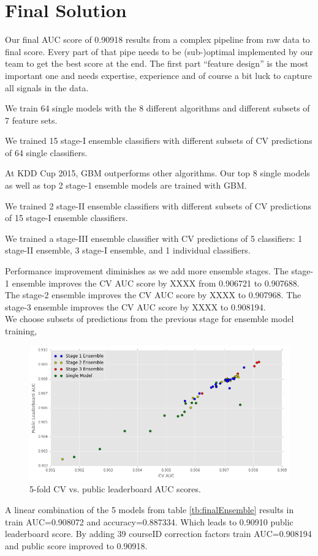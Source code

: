 \section{Final Solution}
Our final AUC score of 0.90918 results from a complex pipeline from raw data to final score.
Every part of that pipe needs to be (sub-)optimal implemented by our team to get the best score at the end.
The first part ``feature design'' is the most important one and needs expertise, experience and of course a bit luck to capture all signals in the data.

We train 64 single models with the 8 different algorithms and different subsets of 7 feature sets.

We trained 15 stage-I ensemble classifiers with different subsets of CV predictions of 64 single classifiers.

At KDD Cup 2015, GBM outperforms other algorithms.  Our top 8 single models as well as top 2 stage-1 ensemble models are trained with GBM.

We trained 2 stage-II ensemble classifiers with different subsets of CV predictions of 15 stage-I ensemble classifiers.

We trained a stage-III ensemble classifier with CV predictions of 5 classifiers: 1 stage-II ensemble, 3 stage-I ensemble, and 1 individual classifiers.

Performance improvement diminishes as we add more ensemble stages.  The stage-1 ensemble improves the CV AUC score by XXXX from 0.906721 to 0.907688.  The stage-2 ensemble improves the CV AUC score by XXXX to 0.907968.  The stage-3 ensemble improves the CV AUC score by XXXX to 0.908194.\\

We choose subsets of predictions from the previous stage for ensemble model training, 
\begin{figure}[t]
  \centering
    \includegraphics[width=0.5 \textwidth]{cv_lb}
      \caption{5-fold CV vs. public leaderboard AUC scores.}
\end{figure}

A linear combination of the 5 models from table \ref{tb:finalEnsemble} results in train AUC=0.908072 and accuracy=0.887334.
Which leads to 0.90910 public leaderboard score.
By adding 39 courseID correction factors train AUC=0.908194 and public score improved to 0.90918.

